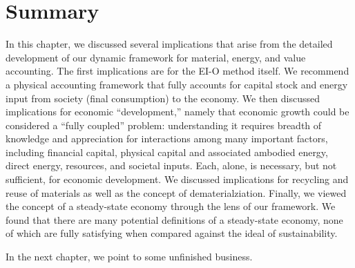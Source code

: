 %


\section{Summary}
\label{sec:summary_implications}

In this chapter, we discussed several implications that arise from 
the detailed development of our dynamic framework for material,
energy, and value accounting.
The first implications are for the EI-O method itself. 
We recommend a physical accounting framework that fully
accounts for capital stock and energy input from society (final consumption)
to the economy.
We then discussed implications for economic ``development,''
namely that economic growth could be considered a ``fully coupled'' problem: 
understanding it requires breadth of knowledge 
and appreciation for interactions among many important factors,
including financial capital, physical capital and associated ambodied energy,
direct energy, resources, and societal inputs.
Each, alone, is necessary, but not sufficient, for economic development.
We discussed implications for recycling and reuse of materials
as well as the concept of dematerialziation.
Finally, we viewed the concept of a steady-state economy through
the lens of our framework.
We found that there are many potential definitions of a steady-state economy,
none of which are fully satisfying when compared against the ideal 
of sustainability.

In the next chapter, we point to some unfinished business.






